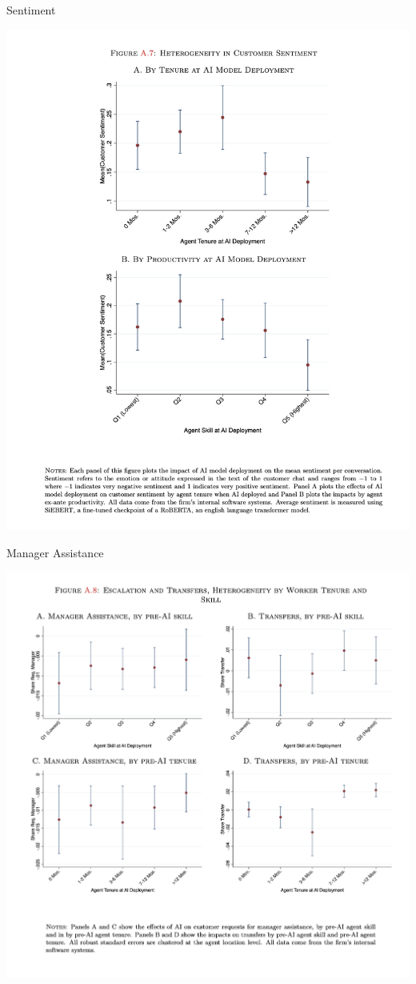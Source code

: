 \documentclass{beamer}
\begin{document}
\begin{frame}{Sentiment}
\begin{center}
\includegraphics[scale=0.3]{./lecture_includes/brynn11}
\end{center}
\end{frame}


\begin{frame}{Manager Assistance}
\begin{center}
\includegraphics[scale=0.25]{./lecture_includes/brynn9}
\end{center}
\end{frame}
\end{document}
